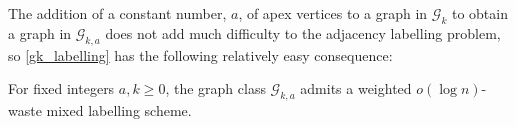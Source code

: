 \documentclass{patmorin}
\DeclareMathOperator{\height}{height}
\DeclareMathOperator{\depth}{depth}
\renewcommand{\ge}{\geqslant}
\renewcommand{\le}{\leqslant}
\newcommand{\defin}[1]{\emph{\textcolor{brightmaroon}{#1}}}
\begin{document}



  The addition of a constant number, $a$, of apex vertices to a graph in $\mathcal{G}_k$ to obtain a graph in $\mathcal{G}_{k,a}$ does not add much difficulty to the adjacency labelling problem, so \cref{gk_labelling} has the following relatively easy consequence:

  \begin{thm}\label{gak_labelling}\label{weighted}
    For fixed integers $a,k\ge 0$, the graph class $\mathcal{G}_{k,a}$ admits a weighted $o(\log n)$-waste mixed labelling scheme.
  \end{thm}
\end{document}
